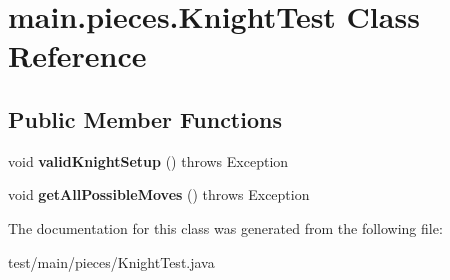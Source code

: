\hypertarget{classmain_1_1pieces_1_1_knight_test}{}\section{main.\+pieces.\+Knight\+Test Class Reference}
\label{classmain_1_1pieces_1_1_knight_test}
\subsection*{Public Member Functions}
\begin{DoxyCompactItemize}
\item 
\mbox{\label{classmain_1_1pieces_1_1_knight_test_ac77ea1bb6a35dd20c0e031e08522089b}} 
void {\bfseries valid\+Knight\+Setup} ()  throws Exception 
\item 
\mbox{\label{classmain_1_1pieces_1_1_knight_test_ad92a6dd771cc561768ee6282eac3e7a8}} 
void {\bfseries get\+All\+Possible\+Moves} ()  throws Exception 
\end{DoxyCompactItemize}


The documentation for this class was generated from the following file\+:\begin{DoxyCompactItemize}
\item 
test/main/pieces/Knight\+Test.\+java\end{DoxyCompactItemize}
